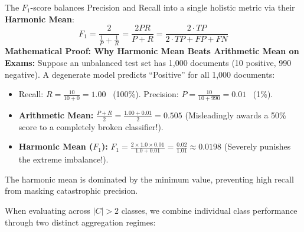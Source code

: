 \documentclass[10pt,a4paper]{article}
\begin{document}
\begin{theoremprompt}[title={\bfseries\sffamily The $F_1$-Measure: Harmonic Mean Derivation \& Proof}]
\footnotesize
The $F_1$-score balances Precision and Recall into a single holistic metric via their \textbf{Harmonic Mean}:
\[
F_1 = \frac{2}{\frac{1}{P} + \frac{1}{R}} = \frac{2 P R}{P + R} = \frac{2 \cdot TP}{2 \cdot TP + FP + FN}
\]
\textbf{Mathematical Proof: Why Harmonic Mean Beats Arithmetic Mean on Exams:}
\newline Suppose an unbalanced test set has 1,000 documents (10 positive, 990 negative). A degenerate model predicts ``Positive'' for all 1,000 documents:
\begin{itemize}[leftmargin=12pt, itemsep=0.5pt, parsep=0pt]
    \item Recall: $R = \frac{10}{10 + 0} = 1.00$ \ (100\%). \qquad Precision: $P = \frac{10}{10 + 990} = 0.01$ \ (1\%).
    \item \textbf{Arithmetic Mean:} $\frac{P + R}{2} = \frac{1.00 + 0.01}{2} = \mathbf{0.505}$ (Misleadingly awards a 50\% score to a completely broken classifier!).
    \item \textbf{Harmonic Mean ($F_1$):} $F_1 = \frac{2 \times 1.0 \times 0.01}{1.0 + 0.01} = \frac{0.02}{1.01} \approx \mathbf{0.0198}$ (Severely punishes the extreme imbalance!).
\end{itemize}
The harmonic mean is dominated by the minimum value, preventing high recall from masking catastrophic precision.
\end{theoremprompt}

\vspace{-2pt}

\par\vspace{1pt}
When evaluating across $|C| > 2$ classes, we combine individual class performance through two distinct aggregation regimes:
\end{document}
